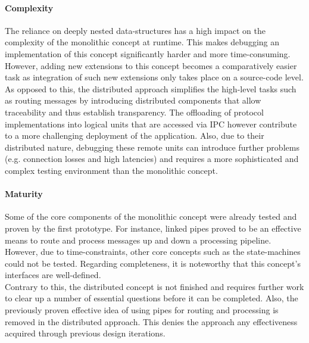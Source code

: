 \paragraph{Complexity}
The reliance on deeply nested data-structures has a high impact on the complexity of the monolithic concept at runtime. This makes debugging an implementation of this concept significantly harder and more time-consuming. However, adding new extensions to this concept becomes a comparatively easier task as integration of such new extensions only takes place on a source-code level.\\
As opposed to this, the distributed approach simplifies the high-level tasks such as routing messages by introducing distributed components that allow traceability and thus establish transparency. The offloading of protocol implementations into logical units that are accessed via \ac{IPC} however contribute to a more challenging deployment of the application. Also, due to their distributed nature, debugging these remote units can introduce further problems (e.g. connection losses and high latencies) and requires a more sophisticated and complex testing environment than the monolithic concept.

\paragraph{Maturity}
Some of the core components of the monolithic concept were already tested and proven by the first prototype. For instance, linked pipes proved to be an effective means to route and process messages up and down a processing pipeline. However, due to time-constraints, other core concepts such as the state-machines could not be tested. Regarding completeness, it is noteworthy that this concept's interfaces are well-defined.\\
Contrary to this, the distributed concept is not finished and requires further work to clear up a number of essential questions before it can be completed. Also, the previously proven effective idea of using pipes for routing and processing is removed in the distributed approach. This denies the approach any effectiveness acquired through previous design iterations.